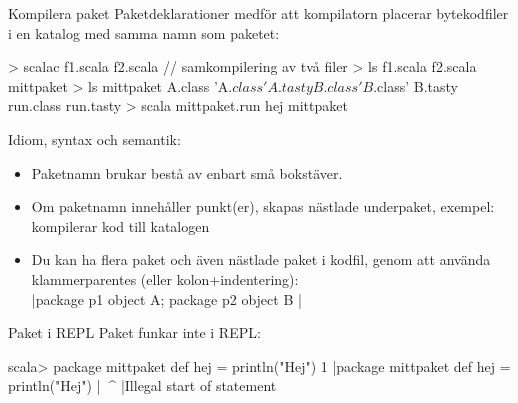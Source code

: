 \begin{Slide}{Kompilera paket}\SlideFontSmall
Paketdeklarationer medför att kompilatorn placerar bytekodfiler i en katalog med samma namn som paketet:
\begin{REPL}
> scalac f1.scala f2.scala     // samkompilering av två filer
> ls
f1.scala  f2.scala  mittpaket
> ls mittpaket
A.class  'A$.class'   A.tasty   
B.class  'B$.class'   B.tasty   run.class   run.tasty
> scala mittpaket.run
hej mittpaket
\end{REPL}
\pause
Idiom, syntax och semantik:
\begin{itemize}
  \item Paketnamn brukar bestå av enbart små bokstäver.
  \item Om paketnamn innehåller punkt(er), skapas nästlade underpaket, exempel:   kompilerar kod till katalogen 
  \item Du kan ha flera paket och även nästlade paket i  kodfil, genom att använda klammerparentes (eller kolon+indentering):\\
  \code|package p1 { object A; package p2 { object B }}|
\end{itemize}
\end{Slide}

\begin{Slide}{Paket i REPL}
Paket funkar inte i REPL:
\begin{REPLnonum}
scala> package mittpaket { def hej = println("Hej") }
1 |package mittpaket { def hej = println("Hej") }
  |^^^^^^^
  |Illegal start of statement
\end{REPLnonum}
\end{Slide}




